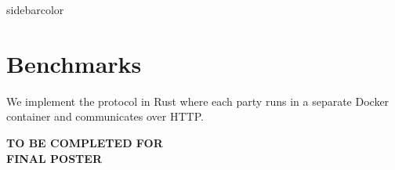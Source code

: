 \documentclass{ali-poster}
\begin{document}
\hspace{\marginwidth}
% 
% 
\begin{panel}{\sidebarwidth}{sidebarcolor}
	\section*{Benchmarks}

	We implement the protocol in Rust where each party runs in a separate Docker container and communicates over HTTP.

	\vspace{5cm}

	\begin{center}
		\textbf{TO BE COMPLETED FOR \\ FINAL POSTER}
	\end{center}

\end{panel}

\end{document}
